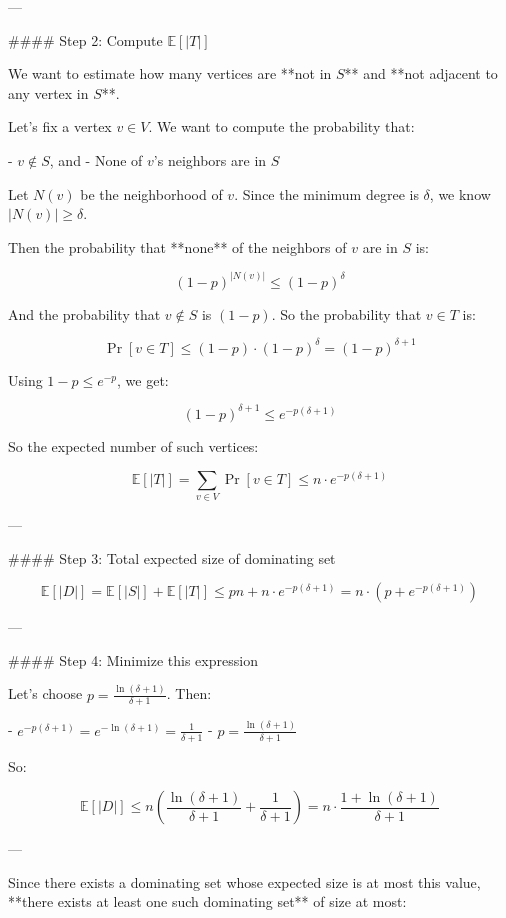 \begin{enumerate}
\begin{shaded}
---

#### Step 2: Compute \( \mathbb{E}[|T|] \)

We want to estimate how many vertices are **not in \( S \)** and **not adjacent to any vertex in \( S \)**.

Let's fix a vertex \( v \in V \). We want to compute the probability that:

- \( v \notin S \), and
- None of \( v \)'s neighbors are in \( S \)

Let \( N(v) \) be the neighborhood of \( v \). Since the minimum degree is \( \delta \), we know \( |N(v)| \geq \delta \).

Then the probability that **none** of the neighbors of \( v \) are in \( S \) is:

\[
(1 - p)^{|N(v)|} \leq (1 - p)^{\delta}
\]

And the probability that \( v \notin S \) is \( (1 - p) \). So the probability that \( v \in T \) is:

\[
\Pr[v \in T] \leq (1 - p) \cdot (1 - p)^{\delta} = (1 - p)^{\delta + 1}
\]

Using \( 1 - p \leq e^{-p} \), we get:

\[
(1 - p)^{\delta + 1} \leq e^{-p(\delta + 1)}
\]

So the expected number of such vertices:

\[
\mathbb{E}[|T|] = \sum_{v \in V} \Pr[v \in T] \leq n \cdot e^{-p(\delta + 1)}
\]

---

#### Step 3: Total expected size of dominating set

\[
\mathbb{E}[|D|] = \mathbb{E}[|S|] + \mathbb{E}[|T|] \leq pn + n \cdot e^{-p(\delta + 1)} = n \cdot \left(p + e^{-p(\delta + 1)}\right)
\]

---

#### Step 4: Minimize this expression

Let's choose \( p = \frac{\ln(\delta + 1)}{\delta + 1} \). Then:

- \( e^{-p(\delta + 1)} = e^{-\ln(\delta + 1)} = \frac{1}{\delta + 1} \)
- \( p = \frac{\ln(\delta + 1)}{\delta + 1} \)

So:

\[
\mathbb{E}[|D|] \leq n \left( \frac{\ln(\delta + 1)}{\delta + 1} + \frac{1}{\delta + 1} \right) = n \cdot \frac{1 + \ln(\delta + 1)}{\delta + 1}
\]

---

Since there exists a dominating set whose expected size is at most this value, **there exists at least one such dominating set** of size at most:


\end{shaded}
\end{enumerate}
